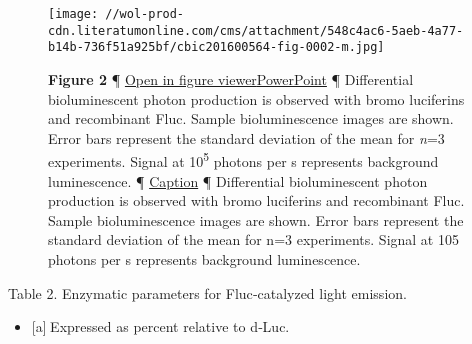\begin{figure}
\centering
\texttt{[image: //wol-prod-cdn.literatumonline.com/cms/attachment/548c4ac6-5aeb-4a77-b14b-736f51a925bf/cbic201600564-fig-0002-m.jpg]}
\caption{\textbf{Figure 2} ¶ \protect\hyperlink{}{Open in figure
viewer}\href{/action/downloadFigures?id=cbic201600564-fig-0002\&doi=10.1002\%2Fcbic.201600564}{PowerPoint}
¶ Differential bioluminescent photon production is observed with bromo
luciferins and recombinant Fluc. Sample bioluminescence images are
shown. Error bars represent the standard deviation of the mean for
\emph{n}=3 experiments. Signal at 10\textsuperscript{5} photons per s
represents background luminescence. ¶
\protect\hyperlink{}{{Caption}\emph{}} ¶ Differential bioluminescent
photon production is observed with bromo luciferins and recombinant
Fluc. Sample bioluminescence images are shown. Error bars represent the
standard deviation of the mean for n=3 experiments. Signal at 105
photons per s represents background luminescence.}
\end{figure}

\hypertarget{cbic201600564-tbl-0002}{}
{Table 2. }Enzymatic parameters for Fluc‐catalyzed light emission.
\begin{itemize}
\tightlist
\item
  \protect\hypertarget{cbic201600564-tnote-0002}{}{{[}a{]} Expressed as
  percent relative to {d}‐Luc.}
\end{itemize}

